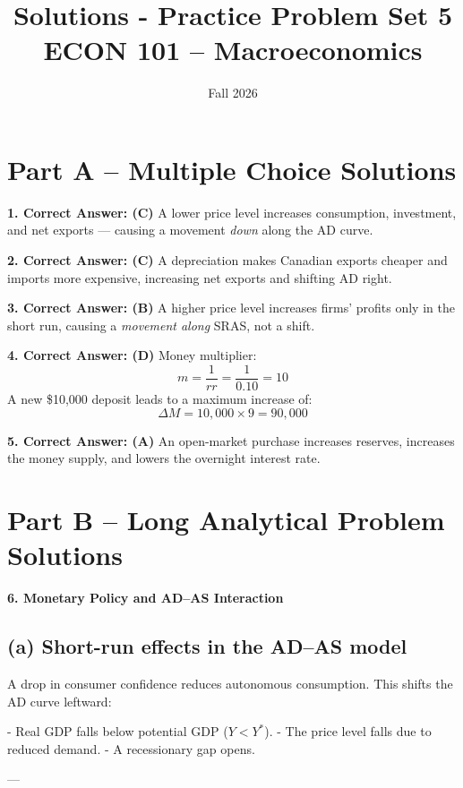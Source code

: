 \documentclass[12pt]{article}
\title{Solutions - Practice Problem Set 5\\ \vspace{15pt} \large ECON 101 -- Macroeconomics}
\author{}
\date{Fall 2026}
\begin{document}
\maketitle

\section*{Part A – Multiple Choice Solutions}

\textbf{1. Correct Answer: (C)}  
A lower price level increases consumption, investment, and net exports — causing a movement \emph{down} along the AD curve.



\textbf{2. Correct Answer: (C)}  
A depreciation makes Canadian exports cheaper and imports more expensive, increasing net exports and shifting AD right.



\textbf{3. Correct Answer: (B)}  
A higher price level increases firms’ profits only in the short run, causing a \emph{movement along} SRAS, not a shift.



\textbf{4. Correct Answer: (D)}  
Money multiplier:  
\[
m = \frac{1}{rr} = \frac{1}{0.10} = 10
\]
A new \$10,000 deposit leads to a maximum increase of:  
\[
\Delta M = 10{,}000 \times 9 = 90{,}000
\]



\textbf{5. Correct Answer: (A)}  
An open-market purchase increases reserves, increases the money supply, and lowers the overnight interest rate.


\newpage
\section*{Part B – Long Analytical Problem Solutions}

\textbf{6. Monetary Policy and AD–AS Interaction}

\subsection*{(a) Short-run effects in the AD–AS model}

A drop in consumer confidence reduces autonomous consumption.  
This shifts the AD curve leftward:

- Real GDP falls below potential GDP (\(Y < Y^*\)).  
- The price level falls due to reduced demand.  
- A recessionary gap opens.

---
\end{document}
